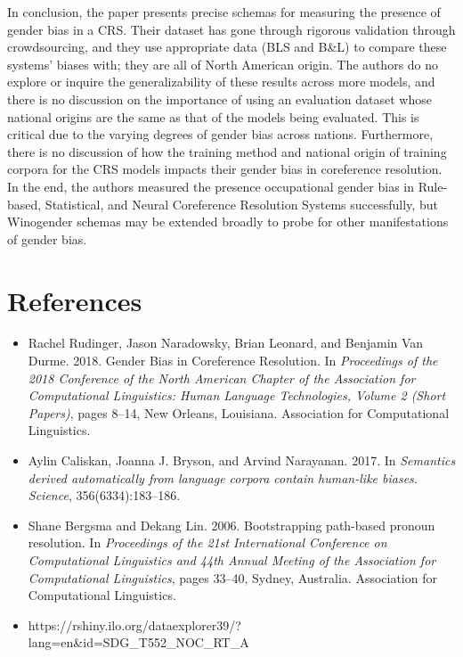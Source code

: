 \documentclass[11pt]{article}
\begin{document}
In conclusion, the paper presents precise schemas for measuring the presence of gender bias in a CRS. Their dataset
has gone through rigorous validation through crowdsourcing, and they use appropriate data (BLS and B\&L) 
to compare these systems' biases with; they are all of North American origin. The authors do no explore or inquire the generalizability of these results across more models, and there is no discussion 
on the importance of using an evaluation dataset whose national origins are the same as that of the models being evaluated. 
This is critical due to the varying degrees of gender bias across nations. Furthermore, there is no discussion of how the training method and national origin 
of training corpora for the CRS models impacts their gender bias in coreference resolution. In the end, the authors 
measured the presence occupational gender bias in Rule-based, Statistical, and Neural Coreference Resolution Systems successfully, but Winogender schemas
may be extended broadly to probe for other manifestations of gender bias.


\section*{References} 
\begin{itemize}
    \item Rachel Rudinger, Jason Naradowsky, Brian Leonard, and Benjamin Van Durme. 2018. Gender Bias in Coreference Resolution. In \textit{Proceedings of the 2018 Conference of the North American Chapter of the Association for Computational Linguistics: Human Language Technologies, Volume 2 (Short Papers)}, pages 8–14, New Orleans, Louisiana. Association for Computational Linguistics.
    \item Aylin Caliskan, Joanna J. Bryson, and Arvind Narayanan. 2017. In \textit{Semantics derived automatically from language corpora contain human-like biases. Science}, 356(6334):183–186.
    \item Shane Bergsma and Dekang Lin. 2006. Bootstrapping
    path-based pronoun resolution. In \textit{Proceedings of the 21st International Conference on Computational Linguistics and 44th Annual Meeting of the Association for Computational Linguistics}, pages 33–40, Sydney, Australia. Association for Computational Linguistics.
    \item https://rshiny.ilo.org/dataexplorer39/?lang=en\&id=SDG\_T552\_NOC\_RT\_A
\end{itemize}
\end{document}

